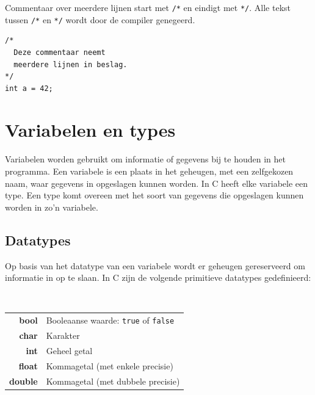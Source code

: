 \documentclass[11pt,fleqn]{book} %
\def\Cpp{{C\nolinebreak[4]\hspace{-.05em}\raisebox{.4ex}{\tiny\bf ++}}}
\begin{document}
\noindent Commentaar over meerdere lijnen start met \texttt{/*} en eindigt met \texttt{*/}. Alle tekst tussen \texttt{/*} en \texttt{*/} wordt door de compiler genegeerd.

\begin{example}
	\phantom{ }
	\begin{verbatim}
/*
  Deze commentaar neemt
  meerdere lijnen in beslag.
*/
int a = 42;
	\end{verbatim}
\end{example}

\chapter{Variabelen en types}
Variabelen worden gebruikt om informatie of gegevens bij te houden in het programma. Een variabele is een plaats in het geheugen, met een zelfgekozen naam, waar gegevens in opgeslagen kunnen worden. In \Cpp{} heeft elke variabele een type. Een type komt overeen met het soort van gegevens die opgeslagen kunnen worden in zo'n variabele.

\section{Datatypes}
\label{section:datatypes}

Op basis van het datatype van een variabele wordt er geheugen gereserveerd om informatie in op te slaan. In \Cpp{} zijn de volgende primitieve datatypes gedefinieerd:

\begin{definition}
	\label{definition:primitieve-datatypes}
	\phantom{ } \\
	\begin{minipage}{\columnwidth}
		\vspace{0.1cm}
		\begin{tabular}{rl}
			\textbf{bool} & Booleaanse waarde: \texttt{true} of \texttt{false} \\
			\textbf{char} & Karakter \\
			\textbf{int} & Geheel getal \\
			\textbf{float} & Kommagetal (met enkele precisie) \\
			\textbf{double} & Kommagetal (met dubbele precisie)
		\end{tabular}
		\vspace{0.1cm}
	\end{minipage}
\end{definition}
\end{document}
